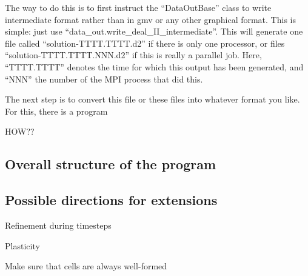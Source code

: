 \documentclass{article}
\begin{document}
The way to do this is to first instruct the ``DataOutBase'' class to
write intermediate format rather than in gmv or any other graphical
format. This is simple: just use
``data\_out.write\_deal\_II\_intermediate''. This will generate one file
called ``solution-TTTT.TTTT.d2'' if there is only one processor, or
files ``solution-TTTT.TTTT.NNN.d2'' if this is really a parallel
job. Here, ``TTTT.TTTT'' denotes the time for which this output has
been generated, and ``NNN'' the number of the MPI process that did this.

The next step is to convert this file or these files into whatever
format you like. For this, there is a program

HOW??


\subsection*{Overall structure of the program}
\subsection*{Possible directions for extensions}

Refinement during timesteps

Plasticity

Make sure that cells are always well-formed
\end{document}
